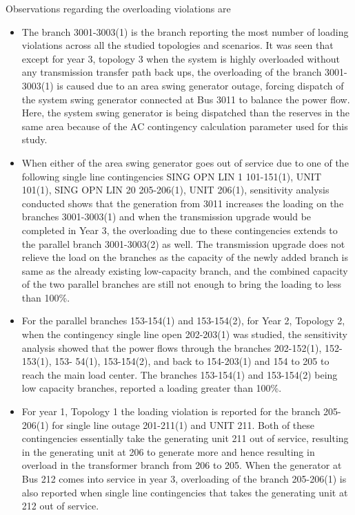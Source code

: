 \documentclass[10pt]{report}
\begin{document}
Observations regarding the overloading violations are
\begin{itemize}
\item The branch 3001-3003(1) is the branch reporting the most number of loading violations across all the studied topologies and scenarios. It was seen that except for year 3, topology 3 when the system is highly overloaded without any transmission transfer path back ups, the overloading of the branch 3001-3003(1) is caused due to an area swing generator outage, forcing dispatch of the system swing generator connected at Bus 3011 to balance the power flow. Here, the system swing generator is being dispatched than the reserves in the same area because of the AC contingency calculation parameter used for this study.
\item When either of the area swing generator goes out of service due to one of the following single line contingencies SING OPN LIN 1 101-151(1), UNIT 101(1), SING OPN LIN 20 205-206(1), UNIT 206(1), sensitivity analysis conducted shows that the generation from 3011 increases the loading on the branches 3001-3003(1) and when the transmission upgrade would be completed in Year 3, the overloading due to these contingencies extends to the parallel branch 3001-3003(2) as well. The transmission upgrade does not relieve the load on the branches as the capacity of the newly added branch is same as the already existing low-capacity branch, and the combined capacity of the two parallel branches are still not enough to bring the loading to less than 100\%. 
\item For the parallel branches 153-154(1) and 153-154(2), for Year 2, Topology 2, when the contingency single line open 202-203(1) was studied, the sensitivity analysis showed that the power flows through the branches 202-152(1), 152-153(1), 153- 54(1), 153-154(2), and back to 154-203(1) and 154 to 205 to reach the main load center. The branches 153-154(1) and 153-154(2) being low capacity branches, reported a loading greater than 100\%.
\item For year 1, Topology 1 the loading violation is reported for the branch 205-206(1) for single line outage 201-211(1) and UNIT 211. Both of these contingencies essentially take the generating unit 211 out of service, resulting in the generating unit at 206 to generate more and hence resulting in overload in the transformer branch from 206 to 205. When the generator at Bus 212 comes into service in year 3, overloading of the branch 205-206(1) is also reported when single line contingencies that takes the generating unit at 212 out of service. 

\end{itemize}
\end{document}

